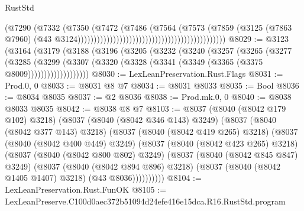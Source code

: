 \begin{lexlean}{RustStd}
\begin{coremodule}
                                                                            (@7290
                                                                              (@7332
                                                                                (@7350
                                                                                  (@7472
                                                                                    (@7486
                                                                                      (@7564
                                                                                        (@7573
                                                                                          (@7859
                                                                                            (@3125
                                                                                              (@7863
                                                                                                @7960)
                                                                                              (@43
                                                                                                @3124))))))))))))))))))))))))))))))))))))))))))))))
@8029 := @3123
    (@3164
      (@3179
        (@3188
          (@3196
            (@3205
              (@3232
                (@3240
                  (@3257
                    (@3265
                      (@3277
                        (@3285
                          (@3299
                            (@3307
                              (@3320 (@3328 (@3341 (@3349 (@3365 (@3375 @8009)))))))))))))))))))
@8030 := LexLeanPreservation.Rust.Flags
@8031 := Prod.{0, 0}
@8033 := @8031 @8 @7
@8034 := @8031 @8033
@8035 := Bool
@8036 := @8034 @8035
@8037 := @2 @8036
@8038 := Prod.mk.{0, 0}
@8040 := @8038 @8033 @8035
@8042 := @8038 @8 @7
@8103 := @8037
    (@8040 (@8042 @179 @102) @3218)
    (@8037
      (@8040 (@8042 @346 @143) @3249)
      (@8037
        (@8040 (@8042 @377 @143) @3218)
        (@8037
          (@8040 (@8042 @419 @265) @3218)
          (@8037
            (@8040 (@8042 @400 @449) @3249)
            (@8037
              (@8040 (@8042 @423 @265) @3218)
              (@8037
                (@8040 (@8042 @800 @802) @3249)
                (@8037
                  (@8040 (@8042 @845 @847) @3249)
                  (@8037
                    (@8040 (@8042 @894 @896) @3218)
                    (@8037 (@8040 (@8042 @1405 @1407) @3218) (@43 @8036))))))))))
@8104 := LexLeanPreservation.Rust.FunOK
@8105 := LexLeanPreserve.C100d0aec372b51094d24efe416e15dca.R16.RustStd.program

\end{coremodule}
\end{lexlean}
